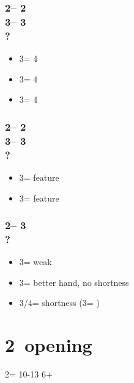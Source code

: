 \documentclass[12pt, a4paper]{report}
\begin{document}
{{{            \subsubsection*{2\hearts -- 2\nt\\
                            3\clubs -- 3\diams\\
                            ?}
            \begin{itemize}
                \item 3\hearts = 4\spades
                \item 3\spades = 4\clubs
                \item 3\nt = 4\diams
            \end{itemize}

            \subsubsection*{2\hearts -- 2\nt\\
                            3\diams -- 3\hearts\\
                            ?}
            \begin{itemize}
                \item 3\spades = \clubs feature
                \item 3\nt = \diams feature
            \end{itemize}

            \subsubsection*{2\hearts -- 3\diams\\
                            ?}
            \begin{itemize}
                \item 3\hearts = weak
                \item 3\spades = better hand, no shortness
                \item 3\nt/4\minor = shortness (3\nt = \spades \shortness)
            \end{itemize}
        }

        \section*{\colorbox{blue!30}{2\spades\ opening}}
         {

            2\spades = 10-13 6+\spades

}}}
\end{document}
